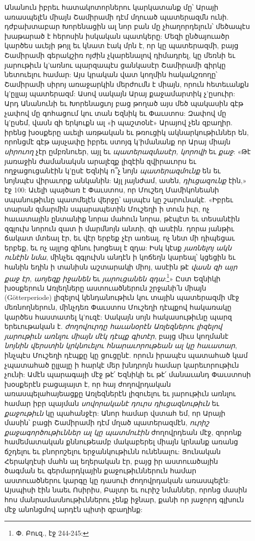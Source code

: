 \documentclass{article}
\begin{document}
{Անանուն իբրեւ հատակոտորներու կարկատանք մը՝ Արայի առասպելէն միայն Շամիրամի դէմ մղուած պատերազմն ունի. դժբախտաբար Խորենացին ալ նոր բան մը չհաղորդելուն՝ մեծապէս խաթարած է հերոսին իսկական պատկերը: Մեզի ընծայուածր կարծես աւեյի թոյլ եւ կնատ էակ մրն է, որ կը պատերազմի, բայց Շամիրամի գերակշիռ ոյժին չկարենալով դիմադրել, կը մեռնի եւ յարութիւն կ'առնու պարզապէս ցանկասէր Շամիրամի գիրկը նետուելու համար: Այս կրական վատ կողմին հակակշռողը՝ Շամիրամի սիրոյ առաջարկին մերժումն է միայն, որուն հետեւանքն կ'ըլլայ պատերազմ: Ասով սակայն Արայ քաջամարտիկ չ'ըսուիր: Արդ Անանունի եւ Խորենացւոյ բաց թողած այս մեծ պակասին գէթ չափով մը գոհացում կու տան Եզնիկ եւ Փաւստոս: Զափով մը կ'ըսեմ, վասն զի երկուքն ալ «ի պաշտօնէ» Արայով չեն զբաղիր. իրենց խօսքերը աւելի առթական եւ թռուցիկ ակնարկութիւններ են, որոնցմէ գէթ այսչափը իբրեւ ստոյգ կ'իմանանք որ Արայ միայն \emph{սիրուող} չէր ըմբռնուեր, այլ եւ \emph{պատերազմասէր, կորովի} եւ \emph{քաջ}: «Թէ յառաջին ժամանակսն արալէզք լիզէին զվիրաւորս եւ ողջացուցանէին կ'ըսէ Եզնիկ ո՞չ նոյն \emph{պատերազմունք} են եւ նոյնպէս վիրաւորք անկանին: Այլ յայնժամ, ասեն, \emph{դիւցազունք} էին,» էջ 100: Աւելի պայծառ է Փաւստոս, որ Մուշեղ Մամիկոնեանի սպանութիւնը պատմելէն վերջը՝ այսպէս կը շարունակէ. «Իբրեւ տարան զմարմին սպարապետին Մուշեղի ի տուն իւր, ոչ հաւատային ընտանիք նորա մահուն նորա, թէպէտ եւ տեսանէին զգլուխ նորուն զատ ի մարմնոյն անտի, զի ասէին. դորա յանթիւ ճակատ մտեալ էր, եւ վէր երբեք չէր առեալ, ոչ նետ մի դիպեցաւ երբեք, եւ ոչ այլոց զինու խոցեալ է զդա: Իսկ կէսք \emph{յառնելոյ ակն ունէին նմա}, մինչեւ զգլուխն անդէն ի կոճեղն կարեալ՝ կցեցին եւ հանին եդին ի տանիսն աշտարակի միոյ, ասէին թէ \emph{վասն զի այր քաջ էր, աոյեզք իջանեն} եւ \emph{յարուցանեն զդա}:\footnote{Փ. Բուզ., էջ 244-245:}» Ըստ Եզնիկի խօսքերուն Առլեղները աստուածներուն շրջանի՛ն միայն (Götterperiode) լիզելով կենդանութիւն կու տային պատերազմի մէջ մեռնողներուն, մինչդեռ Փաւստոս Մուշեղի դէպքով հակառակը կարծես հաստատել կ'ուզէ: Սակայն սոյն հակասութիւնը պարզ երեւութական է. \emph{ժողովուրդը հաւանօրէն Առլեզներու լիզելով յարութիւն առնլու միայն մէկ դէպք գիտէր}, բայց միւս կողմանէ \emph{նոյնին վերստին կրկնուելու հնարաւորութեան ալ կը հաւատար}, ինչպէս Մուշեղի դէպքը կը ցուցընէ. որուն իրապէս պատահած կամ չպատահած ըլլալը ի հարկէ մեր խնդրոյն համար կարեւորութիւն չունի: Ամէն պարագայի մէջ թէ՛ Եզնիկի եւ թէ՛ մանաւանդ Փաւստոսի խօսքերէն բացայայտ է, որ հայ ժողովրդական առասպելահայեացքը Առլեզներէն լիզուելու եւ յարութիւն առնլու համար իբր պայման \emph{սովորականէ դուրս դիւցազնութիւն} եւ \emph{քաջութիւն} կը պահանջէր: Անոր համար վստահ եմ, որ Արայի մասին՝ բացի Շամիրամի դէմ մղած պատերազմէն, \emph{ուրիշ քաջագործութիւններ ալ կը պատմուէին} ժողովրդեան մէջ, զորոնք համեմատական քննութեամբ մակաբերել միայն կրնանք առանց ճշդելու եւ բնորոշելու երջանկութիւնն ունենալու: Յունական Հերակղէսի մահն ալ եղերական էր, բայց իր աստուածային ծագման եւ գերմարդկային քաջութիւններուն համար աստուածներու կարգը կը դասուի ժողովրդական առասպելէն: Այսպիսի էին նաեւ Ոսիրիս, Բալտր եւ ուրիշ նմաններ, որոնց մասին հոս մանրամասնութիւններու չենք իջնար, քանի որ յաջորդ գլխուն մէջ անոնցմով արդէն պիտի զբաղինք:

}
\end{document}
